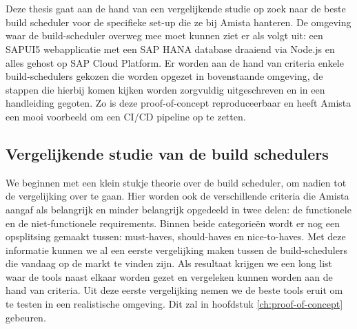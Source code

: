 
\chapter{}
\label{ch:methodologie}

Deze thesis gaat aan de hand van een vergelijkende studie op zoek naar de beste build scheduler voor de specifieke set-up die ze bij Amista hanteren. De omgeving waar de build-scheduler overweg mee moet kunnen ziet er als volgt uit: een SAPUI5 webapplicatie met een SAP HANA database draaiend via Node.js en alles gehost op SAP Cloud Platform. Er worden aan de hand van criteria enkele build-schedulers gekozen die worden opgezet in bovenstaande omgeving, de stappen die hierbij komen kijken worden zorgvuldig uitgeschreven en in een handleiding gegoten. Zo is deze proof-of-concept reproduceerbaar en heeft Amista een mooi voorbeeld om een CI/CD pipeline op te zetten.

    \section{Vergelijkende studie van de build schedulers}
    We beginnen met een klein stukje theorie over de build scheduler, om nadien tot de vergelijking over te gaan. Hier worden ook de verschillende criteria die Amista aangaf als belangrijk en minder belangrijk opgedeeld in twee delen: de functionele en de niet-functionele requirements. Binnen beide categorieën wordt er nog een opsplitsing gemaakt tussen: must-haves, should-haves en nice-to-haves.
    Met deze informatie kunnen we al een eerste vergelijking maken tussen de build-schedulers die vandaag op de markt te vinden zijn. Als resultaat krijgen we een long list waar de tools naast elkaar worden gezet en vergeleken kunnen worden aan de hand van criteria. 
    Uit deze eerste vergelijking nemen we de beste tools eruit om te testen in een realistische omgeving. Dit zal in hoofdstuk \ref{ch:proof-of-concept} gebeuren.

